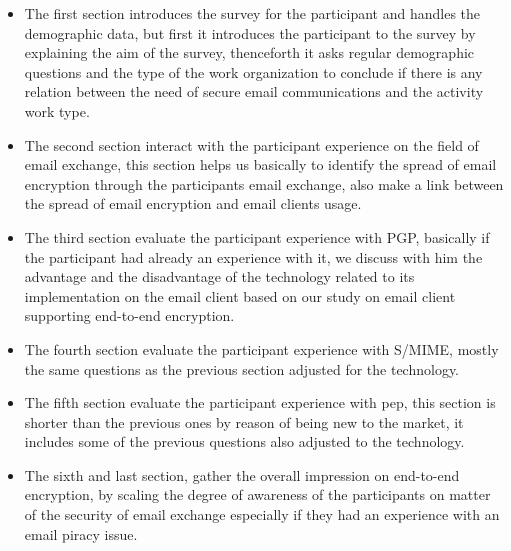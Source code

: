 \begin{itemize}
	\item The first section introduces the survey for the participant and handles the demographic data, but first it introduces the participant to the survey by explaining the aim of the survey, thenceforth it asks regular demographic questions and the type of the work organization to conclude if there is any relation between the need of secure email communications and the activity work type.
	\item The second section interact with the participant experience on the field of email exchange, this section helps us basically to identify the spread of email encryption through the participants email exchange, also make a link between the spread of email encryption and email clients usage.  
	\item The third section evaluate the participant experience with PGP, basically if the participant had already an experience with it, we discuss with him the advantage and the disadvantage of the technology related to its implementation on the email client based on our study on email client supporting end-to-end encryption.
	\item The fourth section evaluate the participant experience with S/MIME, mostly the same questions as the previous section adjusted for the technology.
	\item The fifth section evaluate the participant experience with pep, this section is shorter than the previous ones by reason of being new to the market, it includes some of the previous questions also adjusted to the technology.
	\item The sixth and last section, gather the overall impression on end-to-end encryption, by scaling the degree of awareness of the participants on matter of the security of email exchange especially if they had an experience with an email piracy issue.
\end{itemize}